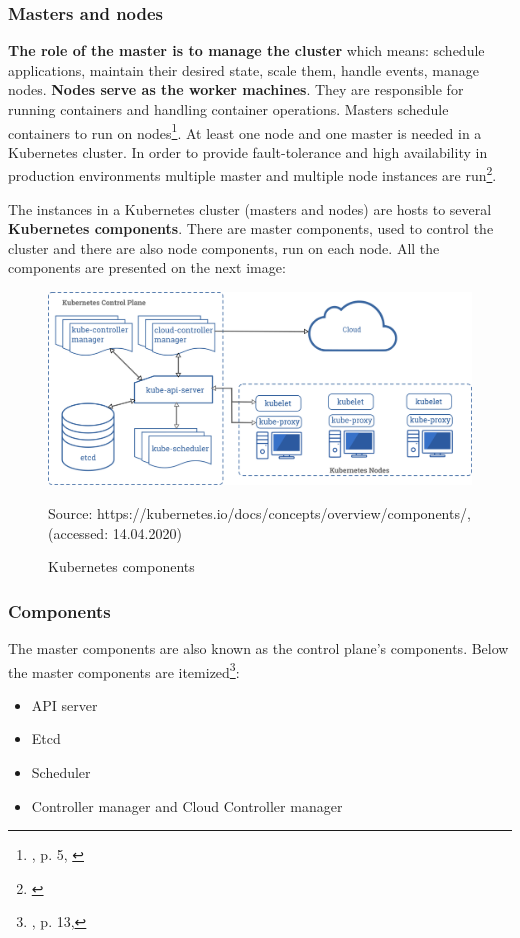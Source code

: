 \subsubsection{Masters and nodes}
\textbf{The role of the master is to manage the cluster} which means: schedule applications, maintain their desired state, scale them, handle events, manage nodes. \textbf{Nodes serve as the worker machines}. They are responsible for running containers and handling container operations. Masters schedule containers to run on nodes\footnote{\cite{book-mastering-k8s}, p. 5, \cite{k8s-cluster}}. At least one node and one master is needed in a Kubernetes cluster. In order to provide fault-tolerance and high availability in production environments multiple master and multiple node instances are run\footnote{\cite{k8s-components}}.

The instances in a Kubernetes cluster (masters and nodes) are hosts to several \textbf{Kubernetes components}. There are master components, used to control the cluster and there are also node components, run on each node. All the components are presented on the next image:
\begin{figure}[H]
    \centering
    \includegraphics[width=14cm]{figures/components-of-kubernetes.png}
    \label{fig:cluster}
    \caption{Kubernetes components}
    \small{Source: https://kubernetes.io/docs/concepts/overview/components/, (accessed: 14.04.2020)}
\end{figure}


\subsubsection{Components}
The master components are also known as the control plane’s components. Below the master components are itemized\footnote{\cite{book-mastering-k8s}, p. 13,\cite{k8s-components}}:
\begin{itemize}
\item API server
\item Etcd
\item Scheduler
\item Controller manager and Cloud Controller manager
\end{itemize}

